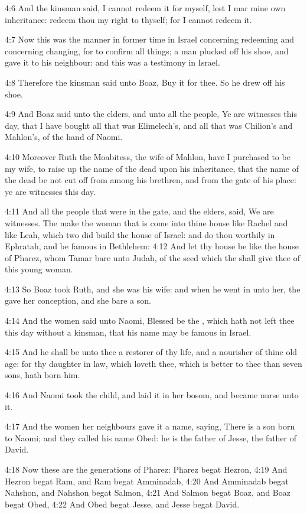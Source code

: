 4:6 And the kinsman said, I cannot redeem it for myself, lest I mar mine own inheritance: redeem thou my right to thyself; for I cannot redeem it.

4:7 Now this was the manner in former time in Israel concerning redeeming and concerning changing, for to confirm all things; a man plucked off his shoe, and gave it to his neighbour: and this was a testimony in Israel.

4:8 Therefore the kinsman said unto Boaz, Buy it for thee. So he drew off his shoe.

4:9 And Boaz said unto the elders, and unto all the people, Ye are witnesses this day, that I have bought all that was Elimelech's, and all that was Chilion's and Mahlon's, of the hand of Naomi.

4:10 Moreover Ruth the Moabitess, the wife of Mahlon, have I purchased to be my wife, to raise up the name of the dead upon his inheritance, that the name of the dead be not cut off from among his brethren, and from the gate of his place: ye are witnesses this day.

4:11 And all the people that were in the gate, and the elders, said, We are witnesses. The \LORD make the woman that is come into thine house like Rachel and like Leah, which two did build the house of Israel: and do thou worthily in Ephratah, and be famous in Bethlehem: 4:12 And let thy house be like the house of Pharez, whom Tamar bare unto Judah, of the seed which the \LORD shall give thee of this young woman.

4:13 So Boaz took Ruth, and she was his wife: and when he went in unto her, the \LORD gave her conception, and she bare a son.

4:14 And the women said unto Naomi, Blessed be the \LORD, which hath not left thee this day without a kinsman, that his name may be famous in Israel.

4:15 And he shall be unto thee a restorer of thy life, and a nourisher of thine old age: for thy daughter in law, which loveth thee, which is better to thee than seven sons, hath born him.

4:16 And Naomi took the child, and laid it in her bosom, and became nurse unto it.

4:17 And the women her neighbours gave it a name, saying, There is a son born to Naomi; and they called his name Obed: he is the father of Jesse, the father of David.

4:18 Now these are the generations of Pharez: Pharez begat Hezron, 4:19 And Hezron begat Ram, and Ram begat Amminadab, 4:20 And Amminadab begat Nahshon, and Nahshon begat Salmon, 4:21 And Salmon begat Boaz, and Boaz begat Obed, 4:22 And Obed begat Jesse, and Jesse begat David.

